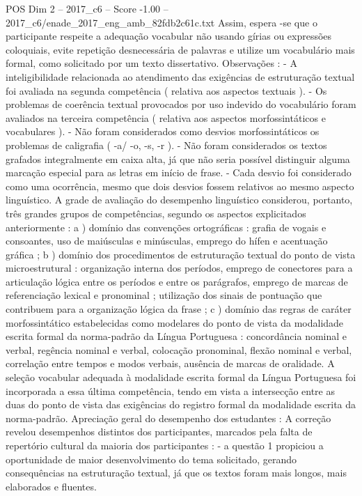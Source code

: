 \begin{textsample}{POS Dim 2 – 2017\_c6 – Score -1.00 – 2017\_c6/enade\_2017\_eng\_amb\_82fdb2c61c.txt}
Assim, espera -se que o participante respeite a adequação vocabular não usando gírias ou expressões coloquiais, evite repetição desnecessária de palavras e utilize um vocabulário mais formal, como solicitado por um texto dissertativo.
Observações : - A inteligibilidade relacionada ao atendimento das exigências de estruturação textual foi avaliada na segunda competência ( relativa aos aspectos textuais ). - Os problemas de coerência textual provocados por uso indevido do vocabulário foram avaliados na terceira competência ( relativa aos aspectos morfossintáticos e vocabulares ). - Não foram considerados como desvios morfossintáticos os problemas de caligrafia ( -a/ -o, -s, -r ). - Não foram considerados os textos grafados integralmente em caixa alta, já que não seria possível distinguir alguma marcação especial para as letras em início de frase. - Cada desvio foi considerado como uma ocorrência, mesmo que dois desvios fossem relativos ao mesmo aspecto linguístico.
A grade de avaliação do desempenho linguístico considerou, portanto, três grandes grupos de competências, segundo os aspectos explicitados anteriormente : a ) domínio das convenções ortográficas : grafia de vogais e consoantes, uso de maiúsculas e minúsculas, emprego do hífen e acentuação gráfica ; b ) domínio dos procedimentos de estruturação textual do ponto de vista microestrutural : organização interna dos períodos, emprego de conectores para a articulação lógica entre os períodos e entre os parágrafos, emprego de marcas de referenciação lexical e pronominal ; utilização dos sinais de pontuação que contribuem para a organização lógica da frase ; c ) domínio das regras de caráter morfossintático estabelecidas como modelares do ponto de vista da modalidade escrita formal da norma-padrão da Língua Portuguesa : concordância nominal e verbal, regência nominal e verbal, colocação pronominal, flexão nominal e verbal, correlação entre tempos e modos verbais, ausência de marcas de oralidade.
A seleção vocabular adequada à modalidade escrita formal da Língua Portuguesa foi incorporada a essa última competência, tendo em vista a intersecção entre as duas do ponto de vista das exigências do registro formal da modalidade escrita da norma-padrão.
Apreciação geral do desempenho dos estudantes : A correção revelou desempenhos distintos dos participantes, marcados pela falta de repertório cultural da maioria dos participantes : - a questão 1 propiciou a oportunidade de maior desenvolvimento do tema solicitado, gerando consequências na estruturação textual, já que os textos foram mais longos, mais elaborados e fluentes.

\end{textsample}
